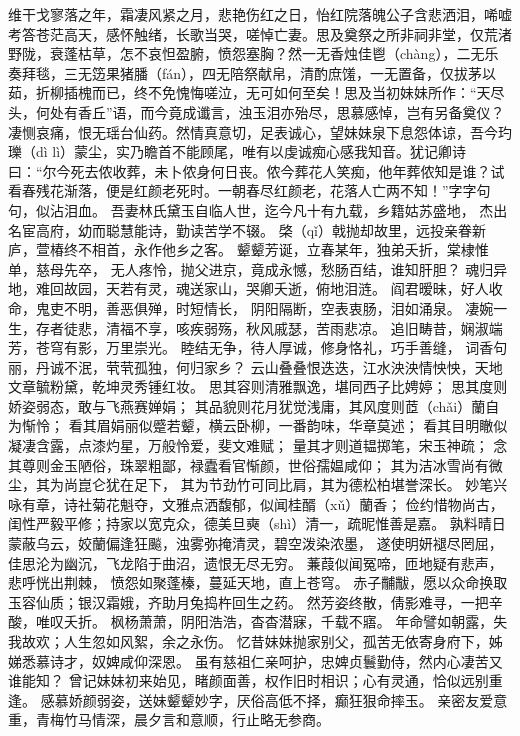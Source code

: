 \documentclass[12pt,oneside]{book}
\begin{document}
维干戈寥落之年，霜凄风紧之月，悲艳伤红之日，怡红院落魄公子含悲洒泪，唏嘘考答苍茫高天，感怀触绪，长歌当哭，嗟悼亡妻。思及奠祭之所非祠非堂，仅荒渚野陇，衰蓬枯草，怎不哀怛盈腑，愤怨塞胸？然一无香烛佳鬯（chàng），二无乐奏拜毯，三无笾果猪膰（fán），四无陪祭献帛，清酌庶馐，一无置备，仅拔茅以茹，折柳插槐而已，终不免愧悔嗟泣，无可如何至矣！思及当初妹妹所作：“天尽头，何处有香丘”语，而今竟成谶言，浊玉泪亦殆尽，思慕感悼，岂有另备奠仪？凄恻哀痛，恨无瑶台仙药。然情真意切，足表诚心，望妹妹泉下息怨体谅，吾今玓瓅（dì lì）蒙尘，实乃瞻首不能顾尾，唯有以虔诚痴心感我知音。犹记卿诗曰：“尔今死去侬收葬，未卜侬身何日丧。侬今葬花人笑痴，他年葬侬知是谁？试看春残花渐落，便是红颜老死时。一朝春尽红颜老，花落人亡两不知！”字字句句，似沾泪血。
吾妻林氏黛玉自临人世，迄今凡十有九载，乡籍姑苏盛地，
杰出名宦高府，幼而聪慧能诗，勤读苦学不辍。
棨（qǐ）戟抛却故里，远投亲眷新庐，萱椿终不相首，永作他乡之客。
颦颦芳诞，立春某年，独弟夭折，棠棣惟单，慈母先卒，
无人疼怜，抛父进京，竟成永憾，愁肠百结，谁知肝胆？
魂归异地，难回故园，天若有灵，魂送家山，哭卿夭逝，俯地泪涟。
阎君暧昧，好人收命，鬼吏不明，善恶俱殚，时短情长，
阴阳隔断，空表衷肠，泪如涌泉。
凄婉一生，存者徒悲，清福不享，咳疾弱殇，秋风戚瑟，苦雨悲凉。
追旧畴昔，娴淑端芳，苍穹有影，万里崇光。
睦结无争，待人厚诚，修身恪礼，巧手善缝，
词香句丽，丹诚不泯，茕茕孤独，何归家乡？
云山叠叠恨迭迭，江水泱泱情怏怏，天地文章毓粉黛，乾坤灵秀锺红妆。
思其容则清雅飘逸，堪同西子比娉婷；
思其度则娇姿弱态，敢与飞燕赛婵娟；
其品貌则花月犹觉浅庸，其风度则茝（chǎi）蘭自为惭怜；
看其眉娟丽似蹙若颦，横云卧柳，一番韵味，华章莫述；
看其目明瞮似凝凄含露，点漆灼星，万般怜爱，斐文难赋；
量其才则道韫掷笔，宋玉神疏；
念其尊则金玉陋俗，珠翠粗鄙，禄蠹看官惭颜，世俗孺媪咸仰；
其为洁冰雪尚有微尘，其为尚崑仑犹在足下，
其为节劲竹可同比肩，其为德松柏堪誉深长。
妙笔兴咏有章，诗社菊花魁夺，文雅点洒馥郁，似闻桂醑（xǔ）蘭香；
俭约惜物尚古，闺性严毅平修；持家以宽克众，德美旦奭（shì）清一，疏昵惟善是嘉。
孰料晴日蒙蔽乌云，姣蘭偏逢狂飈，浊雾弥掩清灵，碧空泼染浓墨，
遂使明妍褪尽罔屈，佳思沦为幽沉，飞龙陷于曲沼，遗恨无尽无穷。
蒹葭似闻冤啼，匝地疑有悲声，悲呼恍出荆棘，
愤怨如聚蓬榛，蔓延天地，直上苍穹。
赤子黼黻，愿以众命换取玉容仙质；银汉霜娥，齐助月兔捣杵回生之药。
然芳姿终散，倩影难寻，一把辛酸，唯叹夭折。
枫杨萧萧，阴阳浩浩，杳杳潜寐，千载不寤。
年命譬如朝露，失我故欢；人生忽如风絮，余之永伤。
忆昔妹妹抛家别父，孤苦无依寄身府下，姊娣悉慕诗才，奴婢咸仰深恩。
虽有慈祖仁亲呵护，忠婢贞鬟勤侍，然内心凄苦又谁能知？
曾记妹妹初来始见，睹颜面善，权作旧时相识；心有灵通，恰似远别重逢。
感慕娇颜弱姿，送妹颦颦妙字，厌俗高低不择，癫狂狠命摔玉。
亲密友爱意重，青梅竹马情深，晨夕言和意顺，行止略无参商。
\end{document}
